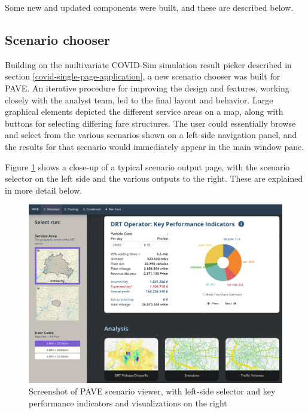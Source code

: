 Some new and updated components were built, and these are described below.

\subsection{Scenario chooser}
\label{pave-scenario-chooser}

Building on the multivariate COVID-Sim simulation result picker described in section \ref{covid-single-page-application}, a new scenario chooser was built for PAVE. An iterative procedure for improving the design and features, working closely with the analyst team, led to the final layout and behavior. Large graphical elements depicted the different service areas on a map, along with buttons for selecting differing fare structures. The user could essentially browse and select from the various scenarios shown on a left-side navigation panel, and the results for that scenario would immediately appear in the main window pane.

Figure \ref{fig:pave-scenario-chooser} shows a close-up of a typical scenario output page, with the scenario selector on the left side and the various outputs to the right. These are explained in more detail below.

\begin{figure}[ht]
  \centering
  \includegraphics[width=0.95\linewidth]{chapters/23-pave/images/fig-kpi-panel.png}
  \caption{Screenshot of PAVE scenario viewer, with left-side selector and key performance indicators and visualizations on the right}
  \label{fig:pave-scenario-chooser}
\end{figure}

